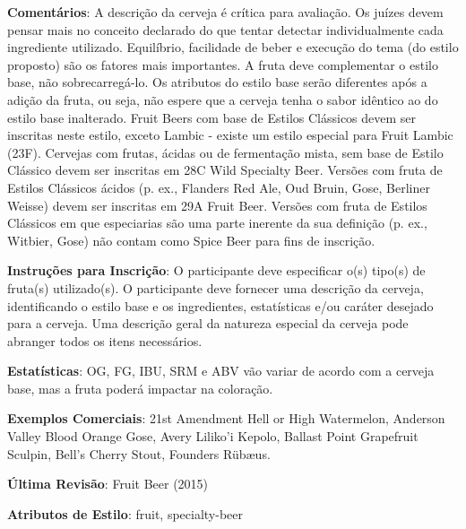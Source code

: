 \textbf{Comentários}: A descrição da cerveja é crítica para avaliação. Os juízes devem pensar mais no conceito declarado do que tentar detectar individualmente cada ingrediente utilizado. Equilíbrio, facilidade de beber e execução do tema (do estilo proposto) são os fatores mais importantes. A fruta deve complementar o estilo base, não sobrecarregá-lo. Os atributos do estilo base serão diferentes após a adição da fruta, ou seja, não espere que a cerveja tenha o sabor idêntico ao do estilo base inalterado. Fruit Beers com base de Estilos Clássicos devem ser inscritas neste estilo, exceto Lambic - existe um estilo especial para Fruit Lambic (23F). Cervejas com frutas, ácidas ou de fermentação mista, sem base de Estilo Clássico devem ser inscritas em 28C Wild Specialty Beer. Versões com fruta de Estilos Clássicos ácidos (p. ex., Flanders Red Ale, Oud Bruin, Gose, Berliner Weisse) devem ser inscritas em 29A Fruit Beer. Versões com fruta de Estilos Clássicos em que especiarias são uma parte inerente da sua definição (p. ex., Witbier, Gose) não contam como Spice Beer para fins de inscrição.

\textbf{Instruções para Inscrição}: O participante deve especificar o(s) tipo(s) de fruta(s) utilizado(s). O participante deve fornecer uma descrição da cerveja, identificando o estilo base e os ingredientes, estatísticas e/ou caráter desejado para a cerveja. Uma descrição geral da natureza especial da cerveja pode abranger todos os itens necessários.

\textbf{Estatísticas}: OG, FG, IBU, SRM e ABV vão variar de acordo com a cerveja base, mas a fruta poderá impactar na coloração.

\textbf{Exemplos Comerciais}: 21st Amendment Hell or High Watermelon, Anderson Valley Blood Orange Gose, Avery Liliko'i Kepolo, Ballast Point Grapefruit Sculpin, Bell's Cherry Stout, Founders Rübæus.

\textbf{Última Revisão}: Fruit Beer (2015)

\textbf{Atributos de Estilo}: fruit, specialty-beer

